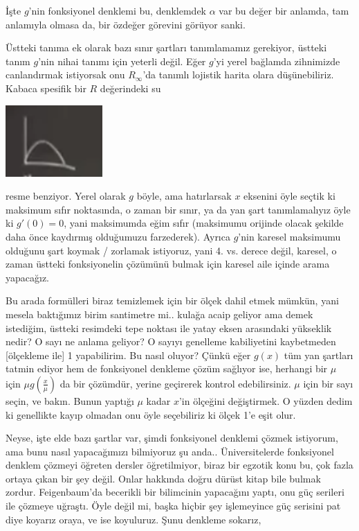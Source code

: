 \documentclass[12pt,fleqn]{article}\usepackage{../../common}
\begin{document}
İşte $g$'nin fonksiyonel denklemi bu, denklemdek $\alpha$ var bu değer bir
anlamda, tam anlamıyla olmasa da, bir özdeğer görevini görüyor sanki. 

Üstteki tanıma ek olarak bazı sınır şartları tanımlamamız gerekiyor, üstteki
tanım $g$'nin nihai tanımı için yeterli değil. Eğer $g$'yi yerel bağlamda
zihnimizde canlandırmak istiyorsak onu $R_\infty$'da tanımlı lojistik harita
olara düşünebiliriz. Kabaca spesifik bir $R$ değerindeki su

\includegraphics[width=10em]{21_09.png}

resme benziyor. Yerel olarak $g$ böyle, ama hatırlarsak $x$ eksenini öyle seçtik
ki maksimum sıfır noktasında, o zaman bir sınır, ya da yan şart tanımlamalıyız
öyle ki $g'(0)=0$, yani maksimumda eğim sıfır (maksimumu orijinde olacak şekilde
daha önce kaydırmış olduğumuzu farzederek). Ayrıca $g$'nin karesel maksimumu
olduğunu şart koymak / zorlamak istiyoruz, yani 4. vs. derece değil, karesel, o
zaman üstteki fonksiyonelin çözümünü bulmak için karesel aile içinde arama
yapacağız. 

Bu arada formülleri biraz temizlemek için bir ölçek dahil etmek mümkün, yani
mesela baktığımız birim santimetre mi.. kulağa acaip geliyor ama demek
istediğim, üstteki resimdeki tepe noktası ile yatay eksen arasındaki yükseklik
nedir? O sayı ne anlama geliyor? O sayıyı genelleme kabiliyetini kaybetmeden
[ölçekleme ile] 1 yapabilirim. Bu nasıl oluyor? Çünkü eğer $g(x)$ tüm yan
şartları tatmin ediyor hem de fonksiyonel denkleme çözüm sağlıyor ise, herhangi
bir $\mu$ için $\mu g(\frac{x}{\mu})$ da bir çözümdür, yerine geçirerek kontrol
edebilirsiniz. $\mu$ için bir sayı seçin, ve bakın. Bunun yaptığı $\mu$ kadar
$x$'in ölçeğini değiştirmek. O yüzden dedim ki genellikte kayıp olmadan onu öyle
seçebiliriz ki ölçek 1'e eşit olur. 

Neyse, işte elde bazı şartlar var, şimdi fonksiyonel denklemi çözmek istiyorum,
ama bunu nasıl yapacağımızı bilmiyoruz şu anda.. Üniversitelerde fonksiyonel
denklem çözmeyi öğreten dersler öğretilmiyor, biraz bir egzotik konu bu, çok
fazla ortaya çıkan bir şey değil. Onlar hakkında doğru dürüst kitap bile bulmak
zordur. Feigenbaum'da becerikli bir bilimcinin yapacağını yaptı, onu güç
serileri ile çözmeye uğraştı. Öyle değil mi, başka hiçbir şey işlemeyince güç
serisini pat diye koyarız oraya, ve ise koyuluruz. Şunu denkleme sokarız,
\end{document}
